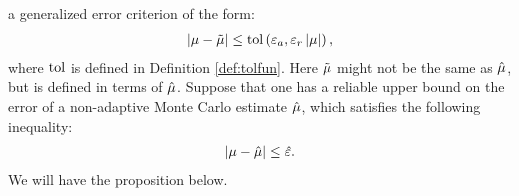 \documentclass{iitthesis}
\theoremstyle{definition}
\begin{document}
a generalized error criterion of the form:
\begin{align}\left \lvert \mu -\tilde{\mu} \right \rvert \leq \operatorname{tol} \left(\varepsilon_a,\varepsilon_r \left \lvert \mu \right \rvert\right),\label{pointwisegeneralizederror} 
\end{align}
where $\operatorname{tol}$ is defined in Definition \ref{def:tolfun}. Here $\tilde{\mu}$ might not be the same as $\hat{\mu}$, but is defined in terms of $\hat{\mu}$. Suppose that one has a reliable upper bound on the error of a non-adaptive Monte Carlo estimate $\hat{\mu}$, which satisfies the following inequality:
\begin{align}
|\mu-\hat{\mu}| \leq \hat{\varepsilon}.  \label{pointwiseerrorbound} 
\end{align} We will have the proposition below.
\end{document}
